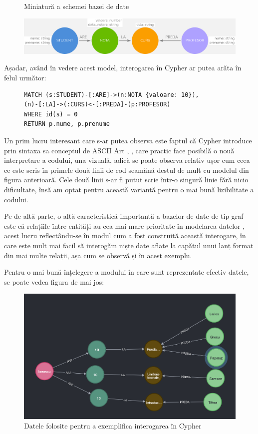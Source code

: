 \documentclass[12pt,a4paper]{report}
\begin{document}
\begin{figure}[h]
\centering
\caption{Miniatură a schemei bazei de date}
\includegraphics[scale=0.4]{exemplu_3_neo4j}
\caption*{}
\end{figure}


Așadar, având în vedere acest model, interogarea în Cypher ar putea arăta în felul următor:

\begin{figure}[h]
\centering
\begin{BVerbatim}
MATCH (s:STUDENT)-[:ARE]->(n:NOTA {valoare: 10}),
(n)-[:LA]->(:CURS)<-[:PREDA]-(p:PROFESOR)
WHERE id(s) = 0
RETURN p.nume, p.prenume
\end{BVerbatim}
\end{figure}



Un prim lucru interesant care s-ar putea observa este faptul că Cypher introduce prin sintaxa sa conceptul de ASCII Art \cite{8}, \cite{9}, care practic face posibilă o nouă interpretare a codului, una vizuală, adică se poate observa relativ ușor cum ceea ce este scris în primele două linii de cod seamănă destul de mult cu modelul din figura anterioară.
Cele două linii s-ar fi putut scrie într-o singură linie fără nicio dificultate, însă am optat pentru această variantă pentru o mai bună lizibilitate a codului.

Pe de altă parte, o altă caracteristică importantă a bazelor de date de tip graf este că relațiile între entități au cea mai mare prioritate în modelarea datelor \cite{10}, acest lucru reflectându-se în modul cum a fost construită această interogare, în care este mult mai facil să interogăm niște date aflate la capătul unui lanț format din mai multe relații, așa cum se observă și în acest exemplu.

Pentru o mai bună înțelegere a modului în care sunt reprezentate efectiv datele, se poate vedea figura de mai jos:

\begin{figure}[h]
\centering
\caption{}
\includegraphics[scale=0.5]{exemplu_4_neo4j}
\caption*{Datele folosite pentru a exemplifica interogarea în Cypher}
\end{figure}
\end{document}
